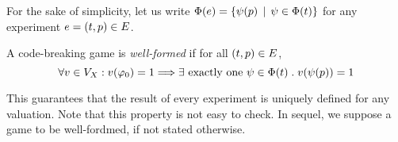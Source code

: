 

For the sake of simplicity, let us write $\Phi(e) = \{ \psi(p) \:\:|\:\: \psi\in\Phi(t)\}$ for any experiment
$e = (t, p) \in E$.

A code-breaking game is \emph{well-formed} if for all $(t, p) \in E$,
\begin{equation} \label{prop-outcome}
\forall v\in V_X:  v(\varphi_0) = 1 ==> \exists \textrm{ exactly one }\psi\in\Phi(t)\;.\; v(\psi(p)) = 1
\end{equation}

This guarantees that the result of every experiment is uniquely defined for any valuation.
Note that this property is not easy to check.
In sequel, we suppose a game to be well-fordmed, if not stated otherwise.



